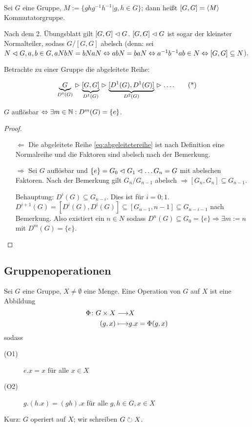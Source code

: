\documentclass[12pt,a4paper]{scrartcl}
\begin{document}
\begin{defi}
	Sei $G$ eine Gruppe, $M := \{ghg^{-1}h^{-1}|g,h\in G\}$; dann heißt $[G,G] = \langle M\rangle$ Kommutatorgruppe.
\end{defi}

\begin{bem}
	Nach dem 2. Übungsblatt gilt $[G,G] \vartriangleleft G$. $[G,G]\vartriangleleft G$ ist sogar der kleinster Normalteiler, sodass $G/[G,G]$ abelsch (denn: sei $N\vartriangleleft G, a,b\in G, aNbN = bNaN\Leftrightarrow abN = baN\Leftrightarrow a^{-1}b^{-1}ab\in N\Leftrightarrow [G,G]\subseteq N$).
\end{bem}

\noindent
Betrachte zu einer Gruppe die abgeleitete Reihe:

\begin{equation}
\underbrace{G}_{D^0(G)} \vartriangleright \underbrace{[G,G]}_{D^1(G)} \vartriangleright \underbrace{[D^1(G),D^1(G)]}_{D^2(G)} \vartriangleright \ldots . \tag{*}\label{eq:abgeleitetereihe}
\end{equation}

\begin{satz}
	$G$ auflösbar $\Leftrightarrow \exists m\in\mathbb N : D^m(G) = \{e\}$.
\end{satz}
\begin{proof}
	\leavevmode
	\begin{itemize}
		\item [\glqq $\Leftarrow$\grqq] Die abgeleitete Reihe \eqref{eq:abgeleitetereihe} ist nach Definition eine Normalreihe und die Faktoren sind abelsch nach der Bemerkung.
		\item [\glqq $\Rightarrow$\grqq] Sei $G$ auflösbar und $\{e\} = G_0\vartriangleleft G_1\vartriangleleft\dots G_n = G$ mit abelschen Faktoren. Nach der Bemerkung gilt $G_n/G_{n-1}$ abelsch $\Rightarrow [G_n,G_n]\subseteq G_{n-1}$.
		
		Behauptung: $D^i(G) \subseteq G_{n-i}$. Dies ist für $i = 0;1$. $D^{i+1}(G) = [D^i(G), D^i(G)]\subseteq [G_{n-1},{n-1}]\subseteq G_{n-i-1}$ nach Bemerkung. Also existiert ein $n\in N$ sodass $D^n(G) \subseteq G_0 = \{e\}\Rightarrow \exists m:=n$ mit $D^m(G) =\{e\}$.
  \qedhere
	\end{itemize}
\end{proof}


\subsection{Gruppenoperationen}
\begin{defi}
	Sei $G$ eine Gruppe, $X\neq \emptyset$ eine Menge. Eine Operation von $G$ auf $X$ ist eine Abbildung
	\begin{align*}
		\Phi\colon G\times X \longrightarrow & X\\
		(g,x) \longmapsto & g.x = \Phi(g,x)
	\end{align*}
	sodass
	\begin{description}
		\item[(O1)] $e.x = x$ für alle $x\in X$
		\item[(O2)] $g.(h.x) = (gh).x$ für alle $g,h\in G, x\in X$
	\end{description}
	Kurz: $G$ operiert auf $X$; wir schreiben $G\circlearrowright X$.
\end{defi}
\end{document}
